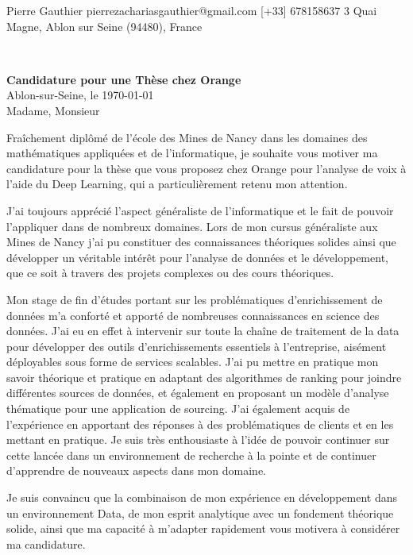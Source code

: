 \documentclass{cv_style}
\begin{document}
    {Pierre Gauthier}
    {{pierrezachariasgauthier@gmail.com}}
    {{[+33] 678158637}}
    {3 Quai Magne, Ablon sur Seine  (94480), France}


%
\vspace{3cm}\\
\begin{flushleft}
    \large
    \textbf{Candidature pour une Thèse chez Orange}\\[0.2cm]
    Ablon-sur-Seine, le \today 
    \\[0.5cm]
    Madame, Monsieur
\end{flushleft}
\vspace{0.2cm}
\large
Fraîchement diplômé de l'école des Mines de Nancy dans les domaines des mathématiques appliquées et de l'informatique, je souhaite vous motiver ma candidature pour la thèse que vous proposez chez Orange pour l'analyse de voix à l'aide du Deep Learning, qui a particulièrement retenu mon attention. 

J'ai toujours apprécié l'aspect généraliste de l'informatique et le fait de pouvoir l'appliquer dans de nombreux domaines. Lors de mon cursus généraliste aux Mines de Nancy j'ai pu constituer des connaissances théoriques solides ainsi que développer un véritable intérêt pour l'analyse de données et le développement, que ce soit à travers des projets complexes ou des cours théoriques. 


Mon stage de fin d'études portant sur les problématiques d'enrichissement de données m'a conforté et apporté de nombreuses connaissances en science des données. J'ai eu en effet à intervenir sur toute la chaîne de traitement de la data pour développer des outils d'enrichissements essentiels à l'entreprise, aisément déployables sous forme de services scalables. 
J'ai pu mettre en pratique mon savoir théorique et pratique en adaptant des algorithmes de ranking pour joindre différentes sources de données, et également en proposant  un modèle d'analyse thématique pour une application de sourcing.  J'ai également acquis de l'expérience en apportant des réponses à des problématiques de clients et en les mettant en pratique. Je suis très enthousiaste à l'idée de pouvoir continuer sur cette lancée dans un environnement de recherche à la pointe et de continuer d'apprendre de nouveaux aspects dans mon domaine.

Je suis convaincu que la combinaison de mon expérience en développement dans un environnement Data, de mon esprit analytique avec un fondement théorique solide, ainsi que ma capacité à m'adapter rapidement vous motivera à considérer ma candidature.
\end{document}
